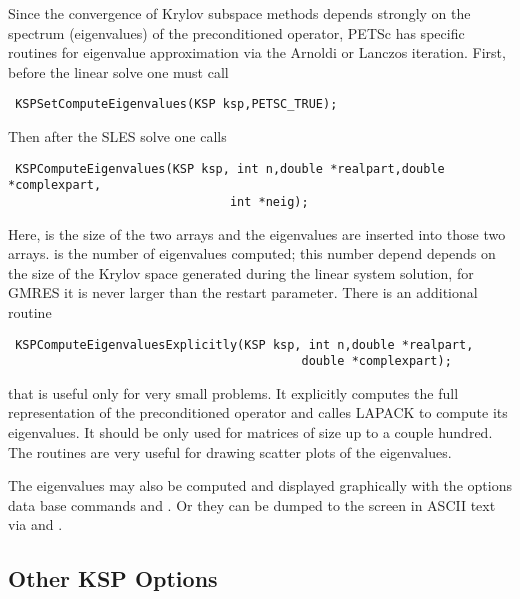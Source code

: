 Since the convergence of Krylov subspace methods depends strongly on 
the spectrum (eigenvalues) of the preconditioned operator, PETSc has specific
routines for eigenvalue approximation via the Arnoldi or Lanczos iteration.
First, before the linear solve one must call 
\begin{verbatim}
 KSPSetComputeEigenvalues(KSP ksp,PETSC_TRUE);
\end{verbatim}
Then after the SLES solve one calls 
\begin{verbatim}
 KSPComputeEigenvalues(KSP ksp, int n,double *realpart,double *complexpart,
                               int *neig);
\end{verbatim}
Here,  is the size of the two arrays and the eigenvalues are 
inserted into those two arrays.  is the number of eigenvalues computed;
this number depend depends on the size of the Krylov space generated during the 
linear system solution, for GMRES it is never larger than the restart parameter.
There is an additional routine 
\begin{verbatim}
 KSPComputeEigenvaluesExplicitly(KSP ksp, int n,double *realpart,
                                         double *complexpart);
\end{verbatim}
that is useful only for very small problems. It explicitly computes the 
full representation of the preconditioned operator and calles LAPACK to 
compute its eigenvalues. It should be only used for matrices of size up to 
a couple hundred.  The  routines are very useful for 
drawing scatter plots of the eigenvalues. 

The eigenvalues may also be computed and displayed graphically with the options 
data base commands  and .
 
Or they can be dumped to the screen in ASCII text via
 and .
 
   

\subsection{Other KSP Options}

